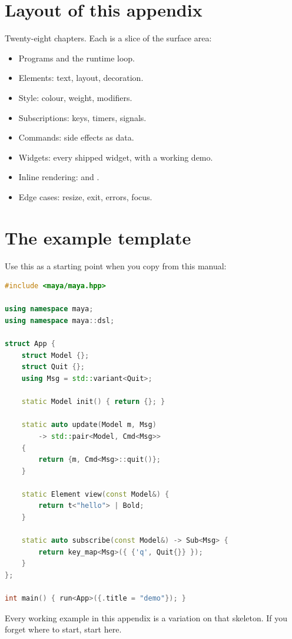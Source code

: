 \section{Layout of this appendix}

Twenty-eight chapters. Each is a slice of the surface area:

\begin{itemize}[leftmargin=*]
  \item Programs and the runtime loop.
  \item Elements: text, layout, decoration.
  \item Style: colour, weight, modifiers.
  \item Subscriptions: keys, timers, signals.
  \item Commands: side effects as data.
  \item Widgets: every shipped widget, with a working demo.
  \item Inline rendering:  and .
  \item Edge cases: resize, exit, errors, focus.
\end{itemize}

\section{The example template}

Use this as a starting point when you copy from this manual:

\begin{lstlisting}[language=C++]
#include <maya/maya.hpp>

using namespace maya;
using namespace maya::dsl;

struct App {
    struct Model {};
    struct Quit {};
    using Msg = std::variant<Quit>;

    static Model init() { return {}; }

    static auto update(Model m, Msg)
        -> std::pair<Model, Cmd<Msg>>
    {
        return {m, Cmd<Msg>::quit()};
    }

    static Element view(const Model&) {
        return t<"hello"> | Bold;
    }

    static auto subscribe(const Model&) -> Sub<Msg> {
        return key_map<Msg>({ {'q', Quit{}} });
    }
};

int main() { run<App>({.title = "demo"}); }
\end{lstlisting}

\noindent Every working example in this appendix is a
variation on that skeleton. If you forget where to start,
start here.

